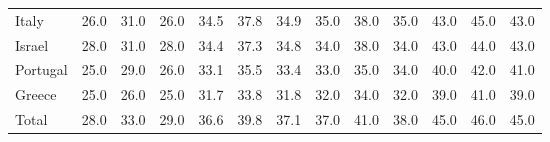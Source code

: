 \begin{table}[H]
\begin{tabular}{lcccccccccccc}
    Italy & 26.0  & 31.0  & 26.0  & 34.5  & 37.8  & 34.9  & 35.0  & 38.0  & 35.0  & 43.0  & 45.0  & 43.0 \\
    Israel & 28.0  & 31.0  & 28.0  & 34.4  & 37.3  & 34.8  & 34.0  & 38.0  & 34.0  & 43.0  & 44.0  & 43.0 \\
    Portugal & 25.0  & 29.0  & 26.0  & 33.1  & 35.5  & 33.4  & 33.0  & 35.0  & 34.0  & 40.0  & 42.0  & 41.0 \\
    Greece & 25.0  & 26.0  & 25.0  & 31.7  & 33.8  & 31.8  & 32.0  & 34.0  & 32.0  & 39.0  & 41.0  & 39.0 \\
    Total & 28.0  & 33.0  & 29.0  & 36.6  & 39.8  & 37.1  & 37.0  & 41.0  & 38.0  & 45.0  & 46.0  & 45.0 \\
    \end{tabular}%
  \label{tab:addlabel}%
\end{table}%
